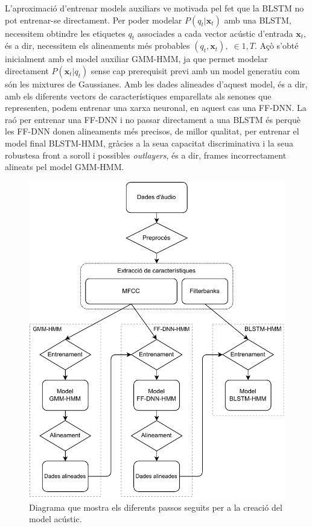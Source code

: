 L'aproximació d'entrenar models auxiliars ve motivada pel fet que la BLSTM no pot entrenar-se directament. 
Per poder modelar $P(q_t|\textbf{x}_t)$ amb una BLSTM, necessitem obtindre les etiquetes $q_t$ associades a cada vector acústic d'entrada $\textbf{x}_t$, és a dir, necessitem els alineaments més probables $(q_t, \textbf{x}_t), \; \in {1,T}$.
Açò s'obté inicialment amb el model auxiliar GMM-HMM, ja que permet modelar directament $P(\textbf{x}_t|q _t)$ sense cap prerequisit previ amb un model generatiu com són les mixtures de Gaussianes.
Amb les dades alineades d'aquest model, és a dir, amb els diferents vectors de característiques emparellats als senones que representen, podem entrenar una xarxa neuronal, en aquest cas una FF-DNN. 
La raó per entrenar una FF-DNN i no passar directament a una BLSTM és perquè les FF-DNN donen alineaments més precisos, de millor qualitat, per entrenar el model final BLSTM-HMM, gràcies a la seua capacitat discriminativa i la seua robustesa front a soroll i possibles \textit{outlayers}, és a dir, frames incorrectament alineats pel model GMM-HMM.

    \begin{figure}[h]
        \centering
        \includegraphics{figuras/resum_am.pdf}
        \caption{Diagrama que mostra els diferents passos seguits per a la creació del model acústic.}
        \label{fig:resum_am}
    \end{figure}

